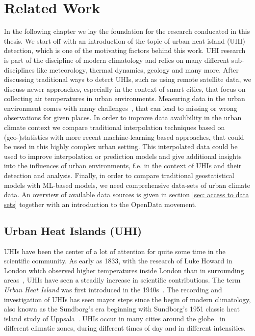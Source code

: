 \chapter{Related Work}
\label{chap:Related Work}

In the following chapter we lay the foundation for the research conducated in this thesis. We start off with an introduction of the topic of urban heat island (UHI) detection, which is one of the motivating factors behind this work. UHI research is part of the discipline of modern climatology and relies on many different sub-disciplines like meteorology, thermal dynamics, geology and many more.
After discussing traditional ways to detect UHIs, such as using remote satellite data, we discuss newer approaches, especially in the context of smart cities, that focus on collecting air temperatures in urban environments. Measuring data in the urban environment comes with many challenges~\cite{oke2006guideline}, that can lead to missing or wrong observations for given places.
In order to improve data availibility in the urban climate context we compare traditional interpolation techniques based on (geo-)statistics with more recent machine-learning based approaches, that could be used in this highly complex urban setting. This interpolated data could be used to improve interpolation or prediction models and give additional insights into the influences of urban environments, f.e. in the context of UHIs and their detection and analysis.
Finally, in order to compare traditional geostatistical models with ML-based models, we need comprehensive data-sets of urban climate data. An overview of available data sources is given in section \ref{sec: access to data sets} together with an introduction to the OpenData movement.

\section{Urban Heat Islands (UHI)}

UHIs have been the center of a lot of attention for quite some time in the scientific community. As early as 1833, with the research of Luke Howard in London which observed higher temperatures inside London than in surrounding areas~\cite{howard1833climate}, UHIs have seen a steadily increase in scientific contributions. The term \textit{Urban Heat Island} was first introduced in the 1940s~\cite{balchin1947micro}. The recording and investigation of UHIs has seen mayor steps since the begin of modern climatology, also known as the Sundborg's era beginning with Sundborg's 1951 classic heat island study of Uppsala~\cite{sundborg1951climatological}. UHIs occur in many cities around the globe~\cite{peng2012surface} in different climatic zones, during different times of day and in different intensities.\\

